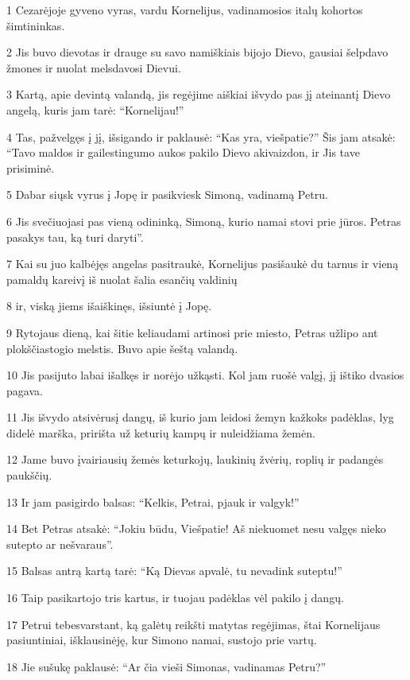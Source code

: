 \par 1 Cezarėjoje gyveno vyras, vardu Kornelijus, vadinamosios italų kohortos šimtininkas. 
\par 2 Jis buvo dievotas ir drauge su savo namiškiais bijojo Dievo, gausiai šelpdavo žmones ir nuolat melsdavosi Dievui. 
\par 3 Kartą, apie devintą valandą, jis regėjime aiškiai išvydo pas jį ateinantį Dievo angelą, kuris jam tarė: “Kornelijau!” 
\par 4 Tas, pažvelgęs į jį, išsigando ir paklausė: “Kas yra, viešpatie?” Šis jam atsakė: “Tavo maldos ir gailestingumo aukos pakilo Dievo akivaizdon, ir Jis tave prisiminė. 
\par 5 Dabar siųsk vyrus į Jopę ir pasikviesk Simoną, vadinamą Petru. 
\par 6 Jis svečiuojasi pas vieną odininką, Simoną, kurio namai stovi prie jūros. Petras pasakys tau, ką turi daryti”. 
\par 7 Kai su juo kalbėjęs angelas pasitraukė, Kornelijus pasišaukė du tarnus ir vieną pamaldų kareivį iš nuolat šalia esančių valdinių 
\par 8 ir, viską jiems išaiškinęs, išsiuntė į Jopę. 
\par 9 Rytojaus dieną, kai šitie keliaudami artinosi prie miesto, Petras užlipo ant plokščiastogio melstis. Buvo apie šeštą valandą. 
\par 10 Jis pasijuto labai išalkęs ir norėjo užkąsti. Kol jam ruošė valgį, jį ištiko dvasios pagava. 
\par 11 Jis išvydo atsivėrusį dangų, iš kurio jam leidosi žemyn kažkoks padėklas, lyg didelė marška, pririšta už keturių kampų ir nuleidžiama žemėn. 
\par 12 Jame buvo įvairiausių žemės keturkojų, laukinių žvėrių, roplių ir padangės paukščių. 
\par 13 Ir jam pasigirdo balsas: “Kelkis, Petrai, pjauk ir valgyk!” 
\par 14 Bet Petras atsakė: “Jokiu būdu, Viešpatie! Aš niekuomet nesu valgęs nieko sutepto ar nešvaraus”. 
\par 15 Balsas antrą kartą tarė: “Ką Dievas apvalė, tu nevadink suteptu!” 
\par 16 Taip pasikartojo tris kartus, ir tuojau padėklas vėl pakilo į dangų. 
\par 17 Petrui tebesvarstant, ką galėtų reikšti matytas regėjimas, štai Kornelijaus pasiuntiniai, išklausinėję, kur Simono namai, sustojo prie vartų. 
\par 18 Jie sušukę paklausė: “Ar čia vieši Simonas, vadinamas Petru?” 

